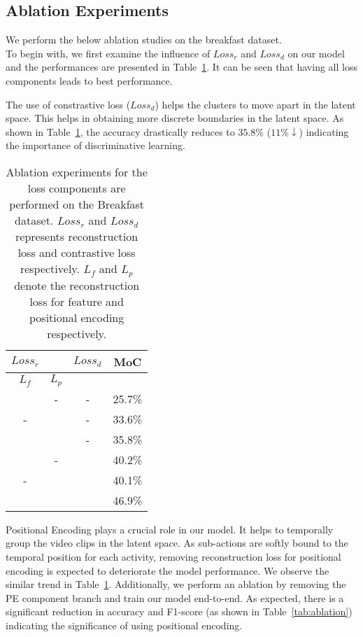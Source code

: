 \documentclass[final]{cvpr}
\newcommand{\cmark}{\ding{51}}
\begin{document}
\subsection{Ablation Experiments}
\label{sec:ablation_exp}
\par We perform the below ablation studies on the breakfast dataset. \\
 To begin with, we first examine the influence of $Loss_{r}$ and $Loss_{d}$ on our model and the performances are presented in Table~\ref{tab:ablation_loss}. It can be seen that having all loss components leads to best performance. 

 The use of constrastive loss ($Loss_{d}$) helps the clusters to move apart in the latent space. This helps in obtaining more discrete boundaries in the latent space. As shown in Table~\ref{tab:ablation_loss}, the accuracy drastically reduces to $35.8\%$ ($11\% \downarrow$) indicating the importance of discriminative learning.

\begin{table}
  \caption{{\small Ablation experiments for the loss components are performed on the Breakfast dataset. $Loss_{r}$ and $Loss_{d}$ represents reconstruction loss and contrastive loss respectively. $L_{f}$ and $L_{p}$ denote the reconstruction loss for feature and positional encoding  respectively.}}
  \label{tab:ablation_loss}
  \centering
  \small
  \begin{tabular}{cc|c|c}
    \toprule
     $Loss_{r}$ & & $Loss_{d}$ & \textbf{MoC} \\
     \midrule
     $L_{f}$ & $L_{p}$ & & \\
     \midrule
     \cmark & - & - &25.7\%\\
     - & \cmark & - & 33.6\%\\
     \cmark & \cmark & - & 35.8\%\\ 
     \midrule
     \cmark & - & \cmark &  40.2\%\\
     - & \cmark & \cmark & 40.1\%\\
     \cmark & \cmark & \cmark & 46.9\%\\
    \bottomrule
    \end{tabular}
\end{table}

 Positional Encoding plays a crucial role in our model. It helps to temporally group the video clips in the latent space. As sub-actions are softly bound to the temporal position for each activity, removing reconstruction loss for positional encoding is expected to deteriorate the model performance. We observe the similar trend in Table~\ref{tab:ablation_loss}. Additionally, we perform an ablation by removing the PE component branch and train our model end-to-end. As expected, there is a significant reduction in accuracy and F1-score (as shown in Table~\ref{tab:ablation}) indicating the significance of using positional encoding.
\end{document}
